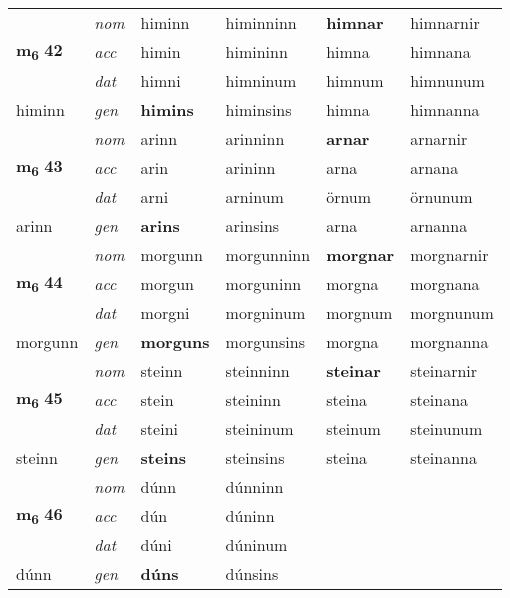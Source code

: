 \begin{longtable}[l]{X>{\footnotesize\itshape}XXXXX}
\multirow{3}{*}{{{\textbf{m{\textsubscript{6}}} \Large{\textbf{42}}}}}  
 & nom & himinn & himinninn    & \textbf{himnar} & himnarnir  \\*
 & acc & himin  & himininn   & himna  & himnana \\*
 & dat & himni & himninum   & himnum & himnunum \\*
 {\footnotesize{himinn}} &  gen & \textbf{himins}  & himinsins  & himna & himnanna \\
\cmidrule{1-6}


\multirow{3}{*}{{{\textbf{m{\textsubscript{6}}} \Large{\textbf{43}}}}}  
 & nom & arinn & arinninn    & \textbf{arnar} & arnarnir  \\*
 & acc & arin  & arininn   & arna  & arnana \\*
 & dat & arni & arninum   & örnum & örnunum \\*
 {\footnotesize{arinn}} &  gen & \textbf{arins}  & arinsins  & arna & arnanna \\
\cmidrule{1-6}


\multirow{3}{*}{{{\textbf{m{\textsubscript{6}}} \Large{\textbf{44}}}}}  
 & nom & morgunn & morgunninn    & \textbf{morgnar} & morgnarnir  \\*
 & acc & morgun  & morguninn   & morgna  & morgnana \\*
 & dat & morgni & morgninum   & morgnum & morgnunum \\*
 {\footnotesize{morgunn}} &  gen & \textbf{morguns}  & morgunsins  & morgna & morgnanna \\
\cmidrule{1-6}


\multirow{3}{*}{{{\textbf{m{\textsubscript{6}}} \Large{\textbf{45}}}}}  
 & nom & steinn & steinninn    & \textbf{steinar} & steinarnir  \\*
 & acc & stein  & steininn   & steina  & steinana \\*
 & dat & steini & steininum   & steinum & steinunum \\*
 {\footnotesize{steinn}} &  gen & \textbf{steins}  & steinsins  & steina & steinanna \\
\cmidrule{1-6}


\multirow{3}{*}{{{\textbf{m{\textsubscript{6}}} \Large{\textbf{46}}}}}  
 & nom & dúnn & dúnninn    & \textbf{} &   \\*
 & acc & dún  & dúninn   &   &  \\*
 & dat & dúni & dúninum   &  &  \\*
 {\footnotesize{dúnn}} &  gen & \textbf{dúns}  & dúnsins  &  &  \\
\cmidrule{1-6}



\end{longtable}
